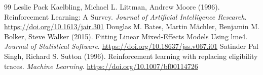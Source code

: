 \documentclass[11pt,a4paper]{article}
\begin{document}
\begin{thebibliography}{99}
 Leslie Pack Kaelbling, Michael L. Littman, Andrew Moore (1996). Reinforcement Learning: A Survey. \emph{Journal of Artificial Intelligence Research}. \url{https://doi.org/10.1613/jair.301}
 Douglas M. Bates, Martin Mächler, Benjamin M. Bolker, Steve Walker (2015). Fitting Linear Mixed-Effects Models Using lme4. \emph{Journal of Statistical Software}. \url{https://doi.org/10.18637/jss.v067.i01}
 Satinder Pal Singh, Richard S. Sutton (1996). Reinforcement learning with replacing eligibility traces. \emph{Machine Learning}. \url{https://doi.org/10.1007/bf00114726}
\end{thebibliography}
\end{document}
